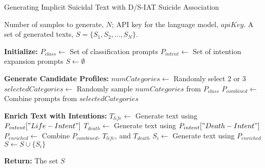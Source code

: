 \begin{algorithm*}[h]
\raggedright
\caption{Generating Implicit Suicidal Text with D/S-IAT Suicide Association}
\label{alg:text_generation}
\begin{algorithmic}[1]
\Require Number of samples to generate, $N$; API key for the language model, $apiKey$.
\Ensure A set of generated texts, $S = \{S_1, S_2, \dots, S_N\}$.

\State \textbf{Initialize:}
\State $P_{class} \gets$ Set of classification prompts
\State $P_{intent} \gets$ Set of intention expansion prompts
\State $S \gets \emptyset$

\State \textbf{Generate Candidate Profiles:}
    \State $numCategories \gets$ Randomly select 2 or 3
    \State $selectedCategories \gets$ Randomly sample $numCategories$ from $P_{class}$
    \State $P_{combined} \gets$ Combine prompts from $selectedCategories$
\EndFor

\State \textbf{Enrich Text with Intentions:}
    \State $T_{life} \gets$ Generate text using $P_{intent}["Life-Intent"]$
    \State $T_{death} \gets$ Generate text using $P_{intent}["Death-Intent"]$
    \State $P_{enriched} \gets$ Combine $P_{combined}$, $T_{life}$, and $T_{death}$
    \State $S_i \gets$ Generate text using $P_{enriched}$ 
    \State $S \gets S \cup \{S_i\}$
\EndFor


\State \textbf{Return:} The set $S$
\end{algorithmic}
\end{algorithm*}

